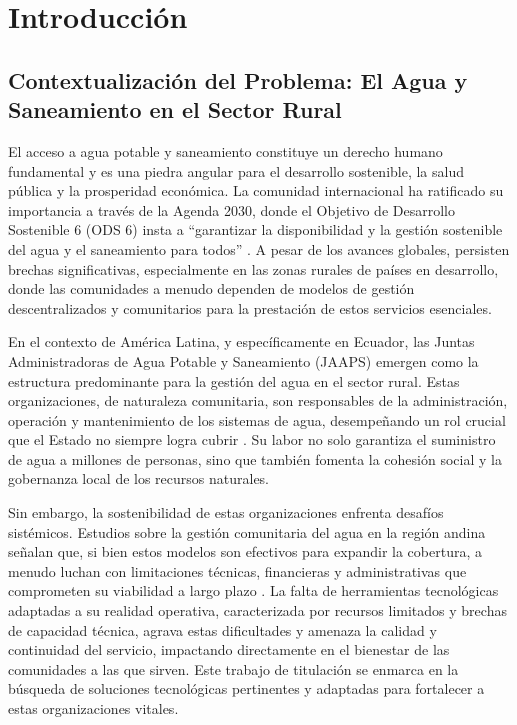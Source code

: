 \chapter{Introducción}

\section{Contextualización del Problema: El Agua y Saneamiento en el Sector Rural}
\label{sec:context}

El acceso a agua potable y saneamiento constituye un derecho humano fundamental y es una piedra angular para el desarrollo sostenible, la salud pública y la prosperidad económica. La comunidad internacional ha ratificado su importancia a través de la Agenda 2030, donde el Objetivo de Desarrollo Sostenible 6 (ODS 6) insta a ``garantizar la disponibilidad y la gestión sostenible del agua y el saneamiento para todos'' \parencite{NacionesUnidas2015}. A pesar de los avances globales, persisten brechas significativas, especialmente en las zonas rurales de países en desarrollo, donde las comunidades a menudo dependen de modelos de gestión descentralizados y comunitarios para la prestación de estos servicios esenciales.

En el contexto de América Latina, y específicamente en Ecuador, las Juntas Administradoras de Agua Potable y Saneamiento (JAAPS) emergen como la estructura predominante para la gestión del agua en el sector rural. Estas organizaciones, de naturaleza comunitaria, son responsables de la administración, operación y mantenimiento de los sistemas de agua, desempeñando un rol crucial que el Estado no siempre logra cubrir \parencite{RoaGarcia2019}. Su labor no solo garantiza el suministro de agua a millones de personas, sino que también fomenta la cohesión social y la gobernanza local de los recursos naturales.

Sin embargo, la sostenibilidad de estas organizaciones enfrenta desafíos sistémicos. Estudios sobre la gestión comunitaria del agua en la región andina señalan que, si bien estos modelos son efectivos para expandir la cobertura, a menudo luchan con limitaciones técnicas, financieras y administrativas que comprometen su viabilidad a largo plazo \parencite{Toma2020}. La falta de herramientas tecnológicas adaptadas a su realidad operativa, caracterizada por recursos limitados y brechas de capacidad técnica, agrava estas dificultades y amenaza la calidad y continuidad del servicio, impactando directamente en el bienestar de las comunidades a las que sirven. Este trabajo de titulación se enmarca en la búsqueda de soluciones tecnológicas pertinentes y adaptadas para fortalecer a estas organizaciones vitales.

